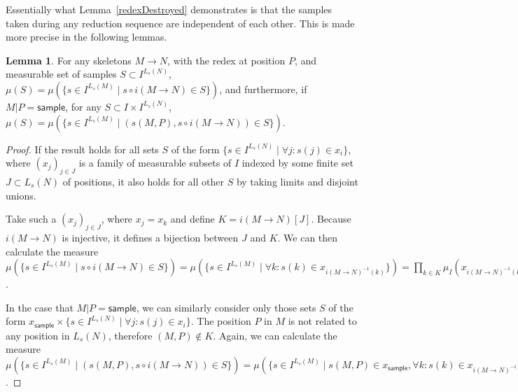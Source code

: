 \documentclass{article}
\newcommand{\tsample}{\textsf{sample}}
\theoremstyle{definition}
\theoremstyle{lemma}
\newtheorem{lemma}{Lemma}
\theoremstyle{remark}
\begin{document}
Essentially what Lemma~\ref{redexDestroyed} demonstrates is that the samples taken during any reduction sequence are independent of each other. This is made more precise in the following lemmas.

\begin{lemma}
For any skeletons $M \to N$, with the redex at position $P$, and measurable set of samples $S \subset I^{L_s(N)}$, $\mu(S) = \mu(\{s \in I^{L_s(M)} \mid s \circ i(M \to N) \in S\})$, and furthermore, if $M | P = \tsample$, for any $S \subset I \times I^{L_s(N)}$, $\mu(S) = \mu(\{s \in I^{L_s(M)} \mid (s(M,P), s \circ i(M \to N)) \in S\})$.
\end{lemma}
\begin{proof}
If the result holds for all sets $S$ of the form $\{s \in I^{L_s(N)} \mid \forall j : s(j) \in x_i\}$, where $(x_j)_{j \in J}$ is a family of measurable subsets of $I$ indexed by some finite set $J \subset L_s(N)$ of positions, it also holds for all other $S$ by taking limits and disjoint unions.

Take such a $(x_j)_{j \in J}$, where $x_j = x_k$ and define $K = i(M \to N)[J]$. Because $i(M \to N)$ is injective, it defines a bijection between $J$ and $K$. We can then calculate the measure $\mu(\{s \in I^{L_s(M)} \mid s \circ i(M \to N) \in S\}) = \mu(\{s \in I^{L_s(M)} \mid \forall k : s(k) \in x_{i(M \to N)^{-1}(k)}\}) = \prod_{k \in K} \mu_I(x_{i(M \to N)^{-1}(k)}) = \prod_{j \in J} \mu_I(x_j) = \mu(S)$.

In the case that $M|P = \tsample$, we can similarly consider only those sets $S$ of the form $x_\tsample \times \{s \in I^{L_s(N)} \mid \forall j : s(j) \in x_i\}$. The position $P$ in $M$ is not related to any position in $L_s(N)$, therefore $(M,P) \not \in K$. Again, we can calculate the measure $\mu(\{s \in I^{L_s(M)} \mid (s(M,P), s \circ i(M \to N)) \in S\}) = \mu(\{s \in I^{L_s(M)} \mid s(M,P) \in x_\tsample, \forall k : s(k) \in x_{i(M \to N)^{-1}(k)}\}) = \mu_I(x_\tsample) \prod_{k \in K} \mu_I(x_{i(M \to N)^{-1}(k)}) = \mu_I(x_\tsample) \prod_{j \in J} \mu_I(x_j) = \mu(S)$.
\end{proof}
\end{document}

